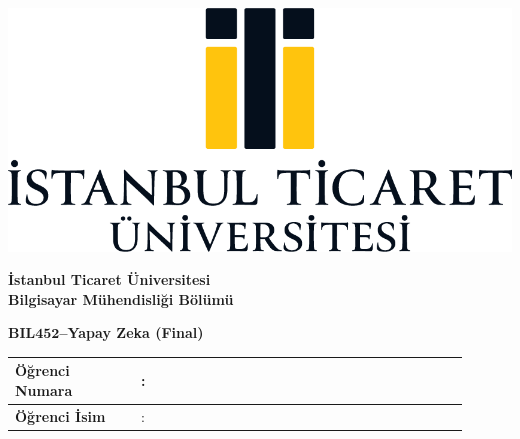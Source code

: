\documentclass[a4paper, 11pt]{article}
\begin{document}
	\thispagestyle{empty}
	\begin{minipage}[c]{\textwidth}
		\begin{minipage}[c]{0.3\textwidth}
			\centering
			\shorthandoff{=} %
			\includegraphics[width=\textwidth]{logo.png}
			\shorthandon{=} %
		\end{minipage}%
		\begin{minipage}[c]{0.7\textwidth}
			\centering
			{\LARGE \textbf{İstanbul Ticaret Üniversitesi}}\\[1em]
			{\Large \textbf{Bilgisayar Mühendisliği Bölümü}}
		\end{minipage}
	\end{minipage}
	
	\begin{center}
		\Large
		\textbf{BIL$\bm{452}$--Yapay Zeka (Final)}
	\end{center}
	
	\begin{table}[!ht]
		\renewcommand{\arraystretch}{2}
		\centering
		\begin{tabular}{@{}|L{0.25\linewidth} C{0.05\linewidth} p{0.60\linewidth}|@{}}
			\hline
			\textbf{Öğrenci Numara}& : & ~ \\ \hline
			\textbf{Öğrenci İsim}  & : & ~ \\ \hline
		\end{tabular}
	\end{table}
	
\end{document}
